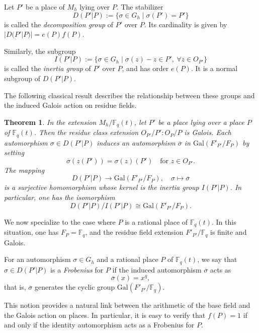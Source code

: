 \documentclass[1p,final]{elsarticle}
\newtheorem{theorem}{Theorem}[section]
\newtheorem{open problem}[theorem]{Open Problem}
\begin{document}
\medskip

Let $P'$ be a place of $M_{h}$ lying over $P$. The stabilizer
\[
D(P'|P):=\{\sigma\in G_{h}\mid \sigma(P')=P'\}
\]
is called the \emph{decomposition group} of $P'$ over $P$. Its cardinality is given by $|D(P'|P)|=e(P)f(P)$.

Similarly, the subgroup
\[
I(P'|P):=\{\sigma\in G_{h}\mid\sigma(z)-z\in P', \ \forall z\in O_{P'}\}
\]
is called the \emph{inertia group} of $P'$ over $P$, and has order $e(P)$. It is a normal subgroup of $D(P'|P)$.

\medskip

The following classical result describes the relationship between these groups and the induced Galois action on residue fields.

\begin{theorem}\cite{Stichtenoth2009}
In the extension $M_{h}/\mathbb{F}_q(t)$, let $P'$ be a place lying over a place $P$ of $\mathbb{F}_q(t)$. Then the residue class extension $O_{P'}/P':O_{P}/P$ is Galois. Each automorphism $\sigma\in D(P'|P)$ induces an automorphism $\overline{\sigma}$ in $\mathrm{Gal}(F'_{P'}/F_{P})$ by setting
\[
\overline{\sigma}(z(P'))=\sigma(z)(P') \quad \text{for } z\in O_{P'}.
\]
The mapping
\[
D(P'|P)\longrightarrow \mathrm{Gal}(F'_{P'}/F_{P}), \quad \sigma \longmapsto \overline{\sigma}
\]
is a surjective homomorphism whose kernel is the inertia group $I(P'|P)$. In particular, one has the isomorphism
\[
D(P'|P)/I(P'|P)\cong \mathrm{Gal}(F'_{P'}/F_{P}).
\]
\end{theorem}

\medskip

We now specialize to the case where $P$ is a rational place of $\mathbb{F}_{q}(t)$. In this situation, one has $F_{P}=\mathbb{F}_{q}$, and the residue field extension $F'_{P'}/\mathbb{F}_{q}$ is finite and Galois.

\medskip

For an automorphism $\sigma\in G_{h}$ and a rational place $P$ of $\mathbb{F}_{q}(t)$, we say that $\sigma\in D(P'|P)$ is a \emph{Frobenius} for $P$ if the induced automorphism $\overline{\sigma}$ acts as
\[
\overline{\sigma}(x)=x^q,
\]
that is, $\overline{\sigma}$ generates the cyclic group $\mathrm{Gal}(F'_{P'}/\mathbb{F}_{q})$.

This notion provides a natural link between the arithmetic of the base field and the Galois action on places. In particular, it is easy to verify that $f(P)=1$ if and only if the identity automorphism acts as a Frobenius for $P$.
\end{document}
